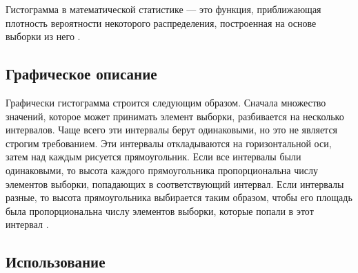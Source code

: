 \documentclass{article}
\begin{document}
Гистограмма в математической статистике --- это функция, приближающая плотность вероятности некоторого распределения, построенная на основе выборки из него \cite{s:hist}.

\subsection{Графическое описание}

Графически гистограмма строится следующим образом. Сначала множество значений, которое может принимать элемент выборки, разбивается на несколько интервалов. Чаще всего эти интервалы берут одинаковыми, но это не является строгим требованием. Эти интервалы откладываются на горизонтальной оси, затем над каждым рисуется прямоугольник. Если все интервалы были одинаковыми, то высота каждого прямоугольника пропорциональна числу элементов выборки, попадающих в соответствующий интервал. Если интервалы разные, то высота прямоугольника выбирается таким образом, чтобы его площадь была пропорциональна числу элементов выборки, которые попали в этот интервал \cite{s:hist}.

\subsection{Использование}
\end{document}
